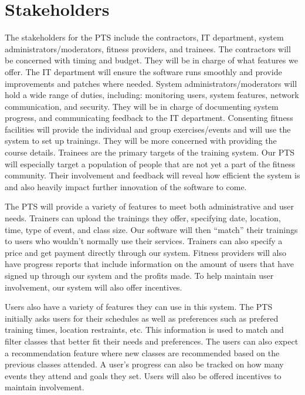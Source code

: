 \documentclass[12pt]{article}
\begin{document}
\section{Stakeholders}
The stakeholders for the PTS include the contractors, IT department, system administrators/moderators, fitness providers, and trainees.  The contractors will be concerned with timing and budget.  They will be in charge of what features we offer.  The IT department will ensure the software runs smoothly and provide improvements and patches where needed.  System administrators/moderators will hold a wide range of duties, including: monitoring users, system features, network communication, and security. They will be in charge of documenting system progress, and communicating feedback to the IT department.  Consenting fitness facilities will provide the individual and group exercises/events and will use the system to set up trainings.  They will be more concerned with providing the course details.  Trainees are the primary targets of the training system.  Our PTS will especially target a population of people that are not yet a part of the fitness community. Their involvement and feedback will reveal how efficient the system is and also heavily impact further innovation of the software to come. 

	The PTS will provide a variety of features to meet both administrative and user needs.  Trainers can upload the trainings they offer, specifying date, location, time, type of event, and class size.  Our software will then “match” their trainings to users who wouldn’t normally use their services.  Trainers can also specify a price and get payment directly through our system.  Fitness providers will also have progress reports that include information on the amount of users that have signed up through our system and the profits made.  To help maintain user involvement, our system will also offer incentives.

	Users also have a variety of features they can use in this system.  The PTS initially asks users for their schedules as well as preferences such as prefered training times, location restraints, etc.  This information is used to match and filter classes that better fit their needs and preferences.  The users can also expect a recommendation feature where new classes are recommended based on the previous classes attended.  A user’s progress can also be tracked on how many events they attend and goals they set.  Users will also be offered incentives to maintain involvement. 
\end{document}
